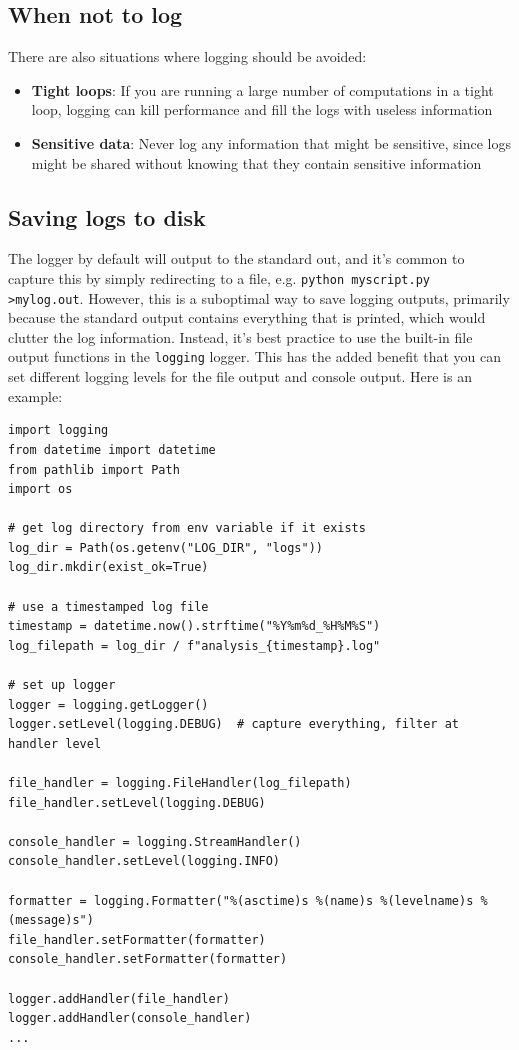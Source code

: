 \subsection{When not to log}

There are also situations where logging should be avoided:

\begin{itemize}
\item \textbf{Tight loops}: If you are running a large number of computations in a tight loop, logging can kill performance and fill the logs with useless information
\item \textbf{Sensitive data}: Never log any information that might be sensitive, since logs might be shared without knowing that they contain sensitive information
\end{itemize}

\subsection{Saving logs to disk}

The logger by default will output to the standard out, and it's common to capture this by simply redirecting to a file, e.g. \texttt{python myscript.py \textgreater  mylog.out}.  However, this is a suboptimal way to save logging outputs, primarily because the standard output contains everything that is printed, which would clutter the log information.  Instead, it's best practice to use the built-in file output functions in the \texttt{logging} logger.  This has the added benefit that you can set different logging levels for the file output and console output.  Here is an example:

\begin{lstlisting}[style=Python]
import logging
from datetime import datetime
from pathlib import Path
import os

# get log directory from env variable if it exists
log_dir = Path(os.getenv("LOG_DIR", "logs"))
log_dir.mkdir(exist_ok=True)

# use a timestamped log file
timestamp = datetime.now().strftime("%Y%m%d_%H%M%S")
log_filepath = log_dir / f"analysis_{timestamp}.log"

# set up logger 
logger = logging.getLogger()
logger.setLevel(logging.DEBUG)  # capture everything, filter at handler level

file_handler = logging.FileHandler(log_filepath)
file_handler.setLevel(logging.DEBUG)

console_handler = logging.StreamHandler()
console_handler.setLevel(logging.INFO)

formatter = logging.Formatter("%(asctime)s %(name)s %(levelname)s %(message)s")
file_handler.setFormatter(formatter)
console_handler.setFormatter(formatter)

logger.addHandler(file_handler)
logger.addHandler(console_handler)
...
\end{lstlisting}

